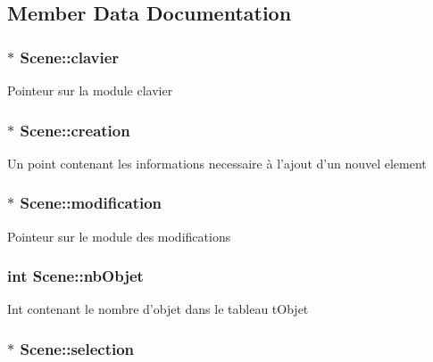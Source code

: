 \subsection{Member Data Documentation}
\hypertarget{structScene_adf482bdfa3b26498f49d562cafdcef1c}{
\subsubsection[{clavier}]{$\ast$ {\bf Scene::clavier}}}
\label{structScene_adf482bdfa3b26498f49d562cafdcef1c}
Pointeur sur la module clavier \hypertarget{structScene_a422e7b7ebb1ae2c32748d7c2b73542d6}{
\subsubsection[{creation}]{$\ast$ {\bf Scene::creation}}}
\label{structScene_a422e7b7ebb1ae2c32748d7c2b73542d6}
Un point contenant les informations necessaire à l'ajout d'un nouvel element \hypertarget{structScene_afae4c847cc90d8c4419030ee2a47b888}{
\subsubsection[{modification}]{$\ast$ {\bf Scene::modification}}}
\label{structScene_afae4c847cc90d8c4419030ee2a47b888}
Pointeur sur le module des modifications \hypertarget{structScene_ab815b00097490fbb5854181b82cde7bb}{
\subsubsection[{nbObjet}]{\setlength{\rightskip}{0pt plus 5cm}int {\bf Scene::nbObjet}}}
\label{structScene_ab815b00097490fbb5854181b82cde7bb}
Int contenant le nombre d'objet dans le tableau tObjet \hypertarget{structScene_aeb68132316fb6167b13ec0fc6419e792}{
\subsubsection[{selection}]{$\ast$ {\bf Scene::selection}}}
